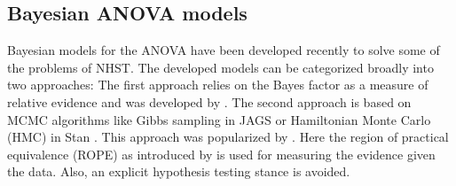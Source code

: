 \subsection{Bayesian ANOVA models}
Bayesian models for the ANOVA have been developed recently to solve some of the problems of NHST. The developed models can be categorized broadly into two approaches: The first approach relies on the Bayes factor as a measure of relative evidence and was developed by \cite{Rouder2012}. The second approach is based on MCMC algorithms like Gibbs sampling in JAGS \citep{Plummer2003} or Hamiltonian Monte Carlo (HMC) in Stan \citep{Carpenter2017, RStan2020}. This approach was popularized by \cite{Kruschke2015}. Here the region of practical equivalence (ROPE) as introduced by \cite{Kruschke2015} is used for measuring the evidence given the data. Also, an explicit hypothesis testing stance is avoided.




